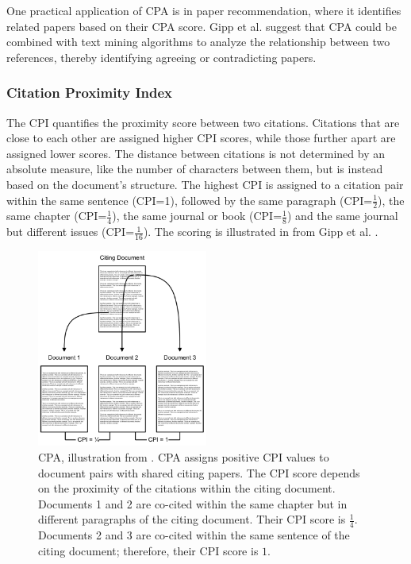 One practical application of \ac{CPA} is in paper recommendation, where it identifies related papers based on their \ac{CPA} score. Gipp et al. \cite{GippCitationProximity2009} suggest that \ac{CPA} could be combined with text mining algorithms to analyze the relationship between two references, thereby identifying agreeing or contradicting papers.

\subsubsection*{Citation Proximity Index} \label{sec:citation-proximity-index}

The \ac{CPI} quantifies the proximity score between two citations. Citations that are close to each other are assigned higher \ac{CPI} scores, while those further apart are assigned lower scores. The distance between citations is not determined by an absolute measure, like the number of characters between them, but is instead based on the document's structure. The highest \ac{CPI} is assigned to a citation pair within the same sentence (CPI=1), followed by the same paragraph (CPI=$\frac{1}{2}$), the same chapter (CPI=$\frac{1}{4}$), the same journal or book (CPI=$\frac{1}{8}$) and the same journal but different issues (CPI=$\frac{1}{16}$). The scoring is illustrated in  from Gipp et al. \cite{GippCitationProximity2009}.

\begin{figure}[ht]
    \centering
    \includegraphics[width=0.5\textwidth]{screenshots/citation_proximity_analysis.png}
    \caption[\acl{CPA}]{\acl{CPA}, illustration from \cite{GippCitationProximity2009}.
        \ac{CPA} assigns positive \ac{CPI} values to document pairs with shared citing papers. The \ac{CPI} score depends on the proximity of the citations within the citing document.
        Documents 1 and 2 are co-cited within the same chapter but in different paragraphs of the citing document. Their \ac{CPI} score is $\frac{1}{4}$. Documents 2 and 3 are co-cited within the same sentence of the citing document; therefore, their \ac{CPI} score is $1$.}
    \label{fig:citation-proximity-analysis}
\end{figure}

